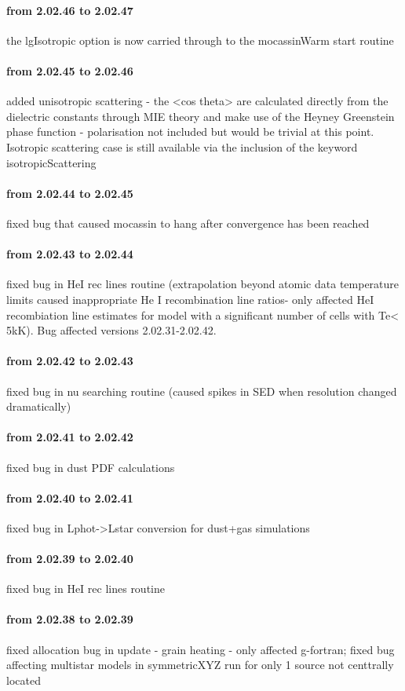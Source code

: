 \documentclass[11pt]{article}
\begin{document}
\paragraph{from 2.02.46 to 2.02.47} the lgIsotropic option is now carried through to the mocassinWarm start routine
\paragraph{from 2.02.45 to 2.02.46} added unisotropic scattering - the <cos theta>  are calculated directly from the dielectric constants through MIE theory and make use of the Heyney Greenstein  phase function - polarisation not included but would be trivial at this point. Isotropic scattering case is still available via the inclusion of the keyword isotropicScattering
\paragraph{from 2.02.44 to 2.02.45} fixed bug that caused mocassin to 
hang after convergence has been reached
\paragraph{from 2.02.43 to 2.02.44} fixed bug in HeI rec lines routine
(extrapolation beyond atomic data temperature limits caused
inappropriate He I recombination line ratios- only affected HeI
recombiation line estimates for model with a significant number of
cells with Te< 5kK). Bug affected versions 2.02.31-2.02.42.
\paragraph{from 2.02.42 to 2.02.43} fixed bug in nu searching routine
(caused spikes in SED when resolution changed dramatically)
\paragraph{from 2.02.41 to 2.02.42} fixed bug in dust PDF calculations
\paragraph{from 2.02.40 to 2.02.41} fixed bug in Lphot->Lstar
conversion for dust+gas simulations
\paragraph{from 2.02.39 to 2.02.40} fixed bug in HeI rec lines routine
\paragraph{from 2.02.38 to 2.02.39} fixed allocation bug in update -
grain heating - only affected g-fortran; fixed bug affecting multistar
models in symmetricXYZ run for only 1 source not centtrally located
\end{document}

